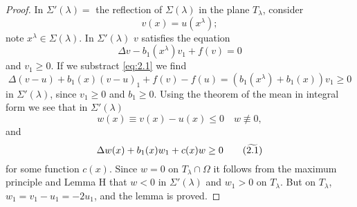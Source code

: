 \begin{proof}
  In $\Sigma'(\lambda)=$ the reflection of $\Sigma(\lambda)$ in the plane $T_\lambda$,
  consider
  \[v(x) = u(x^\lambda);\]
  note $x^\lambda\in\Sigma(\lambda)$. In $\Sigma'(\lambda)$ $v$ satisfies the equation
  \[\Delta v - b_1(x^\lambda)v_1 + f(v) = 0\]
  and $v_1\geq 0$. If we substract \eqref{eq:2.1} we find
  \begin{equation}\label{eq:2.4}
    \Delta(v-u) + b_1(x)(v-u)_1 + f(v) - f(u)
    = (b_1(x^\lambda) + b_1(x))v_1\geq 0
  \end{equation}
  in $\Sigma'(\lambda)$, since $v_1\geq 0$ and $b_1\geq 0$.
  Using the theorem of the mean in integral form we see that in $\Sigma'(\lambda)$
  \[w(x)\equiv v(x) - u(x) \leq 0\quad w\not\equiv 0,\]
  and
  \begin{equation}\label{eq:2.1tilde}
    \Delta w(x) + b_1(x)w_1 + c(x)w \geq 0 \tag{$\widetilde{2.1}$}
  \end{equation}
  for some function $c(x)$. Since $w=0$ on $T_\lambda\cap \Omega$ it follows
  from the maximum principle and Lemma H that $w<0$ in $\Sigma'(\lambda)$
  and $w_1>0$ on $T_\lambda$.
  But on $T_\lambda$, $w_1=v_1-u_1 = -2u_1$,
  and the lemma is proved.
\end{proof}

